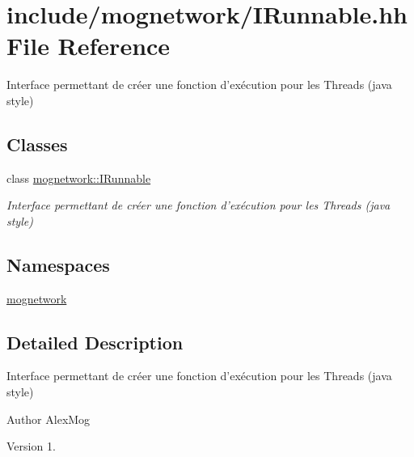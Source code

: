 \hypertarget{_i_runnable_8hh}{\section{include/mognetwork/\-I\-Runnable.hh File Reference}
\label{_i_runnable_8hh}
}


Interface permettant de créer une fonction d'exécution pour les Threads (java style)  


\subsection*{Classes}
\begin{DoxyCompactItemize}
\item 
class \hyperlink{classmognetwork_1_1_i_runnable}{mognetwork\-::\-I\-Runnable}
\begin{DoxyCompactList}\small\item\em Interface permettant de créer une fonction d'exécution pour les Threads (java style) \end{DoxyCompactList}\end{DoxyCompactItemize}
\subsection*{Namespaces}
\begin{DoxyCompactItemize}
\item 
\hyperlink{namespacemognetwork}{mognetwork}
\end{DoxyCompactItemize}


\subsection{Detailed Description}
Interface permettant de créer une fonction d'exécution pour les Threads (java style) \begin{DoxyAuthor}{Author}
Alex\-Mog 
\end{DoxyAuthor}
\begin{DoxyVersion}{Version}
1. 
\end{DoxyVersion}

